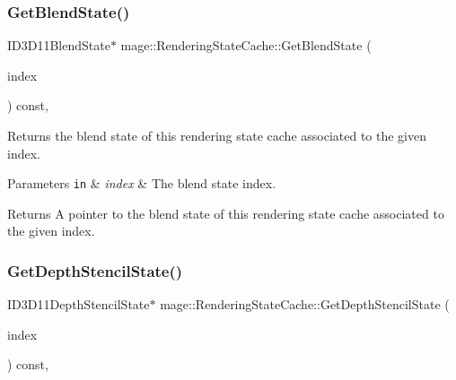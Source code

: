 \subsubsection{\texorpdfstring{Get\+Blend\+State()}{GetBlendState()}}
{\footnotesize\ttfamily I\+D3\+D11\+Blend\+State$\ast$ mage\+::\+Rendering\+State\+Cache\+::\+Get\+Blend\+State (\begin{DoxyParamCaption}\item[{\hyperlink{structmage_1_1_rendering_state_cache_af1d994cc6a3134ded0b24353de5686d0}{Blend\+State\+Index}}]{index }\end{DoxyParamCaption}) const\hspace{0.3cm}{\ttfamily [private]}, {\ttfamily [noexcept]}}

Returns the blend state of this rendering state cache associated to the given index.


\begin{DoxyParams}[1]{Parameters}
\mbox{\tt in}  & {\em index} & The blend state index. \\
\hline
\end{DoxyParams}
\begin{DoxyReturn}{Returns}
A pointer to the blend state of this rendering state cache associated to the given index. 
\end{DoxyReturn}
\hypertarget{structmage_1_1_rendering_state_cache_a85f93628c23e3faf816acaf874fdd9b6}{}\label{structmage_1_1_rendering_state_cache_a85f93628c23e3faf816acaf874fdd9b6} 
\subsubsection{\texorpdfstring{Get\+Depth\+Stencil\+State()}{GetDepthStencilState()}}
{\footnotesize\ttfamily I\+D3\+D11\+Depth\+Stencil\+State$\ast$ mage\+::\+Rendering\+State\+Cache\+::\+Get\+Depth\+Stencil\+State (\begin{DoxyParamCaption}\item[{\hyperlink{structmage_1_1_rendering_state_cache_af6e27c63442c684390b23b6a85020f15}{Depth\+Stencil\+State\+Index}}]{index }\end{DoxyParamCaption}) const\hspace{0.3cm}{\ttfamily [private]}, {\ttfamily [noexcept]}}

